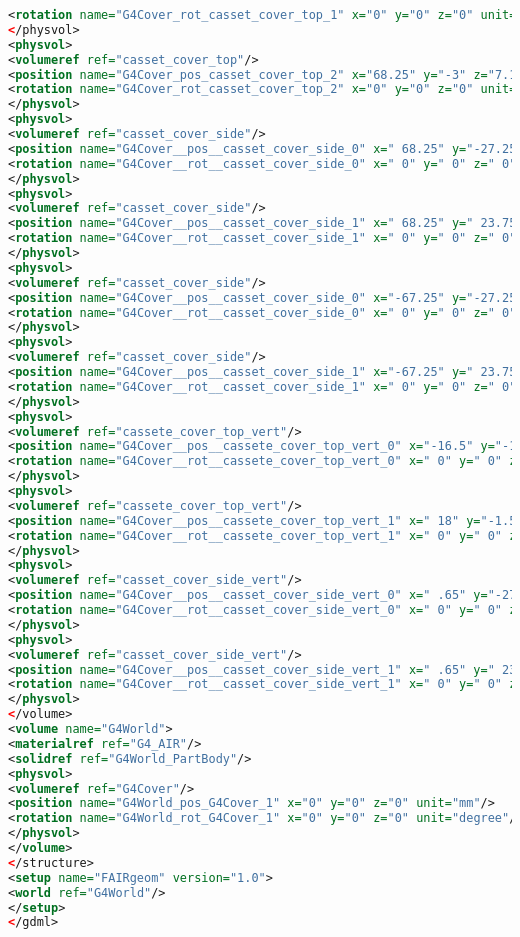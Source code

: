 \begin{lstlisting}[language=XML, firstline=1, lastline=89]
<rotation name="G4Cover_rot_casset_cover_top_1" x="0" y="0" z="0" unit="degree"/>
</physvol>
<physvol>
<volumeref ref="casset_cover_top"/>
<position name="G4Cover_pos_casset_cover_top_2" x="68.25" y="-3" z="7.15" unit="mm"/>
<rotation name="G4Cover_rot_casset_cover_top_2" x="0" y="0" z="0" unit="degree"/>
</physvol>
<physvol>
<volumeref ref="casset_cover_side"/>
<position name="G4Cover__pos__casset_cover_side_0" x=" 68.25" y="-27.25" z="-10" unit="mm"/>
<rotation name="G4Cover__rot__casset_cover_side_0" x=" 0" y=" 0" z=" 0" unit="deg"/>
</physvol>
<physvol>
<volumeref ref="casset_cover_side"/>
<position name="G4Cover__pos__casset_cover_side_1" x=" 68.25" y=" 23.75" z="-10" unit="mm"/>
<rotation name="G4Cover__rot__casset_cover_side_1" x=" 0" y=" 0" z=" 0" unit="deg"/>
</physvol>
<physvol>
<volumeref ref="casset_cover_side"/>
<position name="G4Cover__pos__casset_cover_side_0" x="-67.25" y="-27.25" z="-10" unit="mm"/>
<rotation name="G4Cover__rot__casset_cover_side_0" x=" 0" y=" 0" z=" 0" unit="deg"/>
</physvol>
<physvol>
<volumeref ref="casset_cover_side"/>
<position name="G4Cover__pos__casset_cover_side_1" x="-67.25" y=" 23.75" z="-10" unit="mm"/>
<rotation name="G4Cover__rot__casset_cover_side_1" x=" 0" y=" 0" z=" 0" unit="deg"/>
</physvol>
<physvol>
<volumeref ref="cassete_cover_top_vert"/>
<position name="G4Cover__pos__cassete_cover_top_vert_0" x="-16.5" y="-1.5" z=" .05" unit="mm"/>
<rotation name="G4Cover__rot__cassete_cover_top_vert_0" x=" 0" y=" 0" z=" 0" unit="deg"/>
</physvol>
<physvol>
<volumeref ref="cassete_cover_top_vert"/>
<position name="G4Cover__pos__cassete_cover_top_vert_1" x=" 18" y="-1.5" z=" .05" unit="mm"/>
<rotation name="G4Cover__rot__cassete_cover_top_vert_1" x=" 0" y=" 0" z=" 0" unit="deg"/>
</physvol>
<physvol>
<volumeref ref="casset_cover_side_vert"/>
<position name="G4Cover__pos__casset_cover_side_vert_0" x=" .65" y="-27.25" z=" .05" unit="mm"/>
<rotation name="G4Cover__rot__casset_cover_side_vert_0" x=" 0" y=" 0" z=" 0" unit="deg"/>
</physvol>
<physvol>
<volumeref ref="casset_cover_side_vert"/>
<position name="G4Cover__pos__casset_cover_side_vert_1" x=" .65" y=" 23.75" z=" .05" unit="mm"/>
<rotation name="G4Cover__rot__casset_cover_side_vert_1" x=" 0" y=" 0" z=" 0" unit="deg"/>
</physvol>
</volume>
<volume name="G4World">
<materialref ref="G4_AIR"/>
<solidref ref="G4World_PartBody"/>
<physvol>
<volumeref ref="G4Cover"/>
<position name="G4World_pos_G4Cover_1" x="0" y="0" z="0" unit="mm"/>
<rotation name="G4World_rot_G4Cover_1" x="0" y="0" z="0" unit="degree"/>
</physvol>
</volume>
</structure>
<setup name="FAIRgeom" version="1.0">
<world ref="G4World"/>
</setup>
</gdml>

\end{lstlisting}

